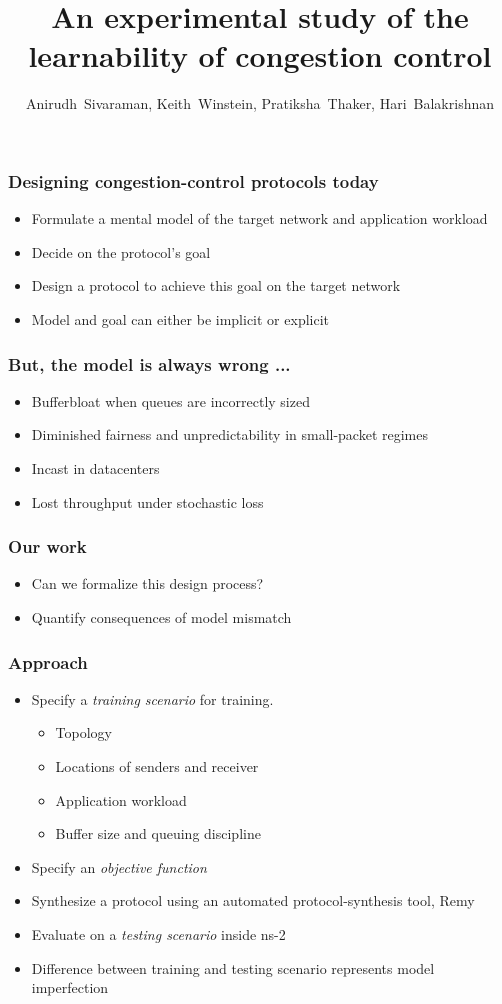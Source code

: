 \documentclass[svgnames]{beamer}
\title{An experimental study of the learnability of congestion control}
\author{Anirudh~Sivaraman, Keith~Winstein, Pratiksha~Thaker, Hari~Balakrishnan}
\institute{MIT CSAIL\vspace{\baselineskip}}
\begin{document}
\begin{frame}[plain]

\titlepage

\end{frame}

\begin{Large}
\begin{frame}[plain]
\frametitle{Designing congestion-control protocols today}
\begin{itemize}
\item Formulate a mental model of the target network and application workload
\item Decide on the protocol's goal
\item Design a protocol to achieve this goal on the target network
\item Model and goal can either be implicit or explicit
\end{itemize}
\end{frame}

\begin{frame}[plain]
\frametitle{But, the model is always wrong ...}
\begin{itemize}
\item Bufferbloat when queues are incorrectly sized
\item Diminished fairness and unpredictability in small-packet regimes
\item Incast in datacenters
\item Lost throughput under stochastic loss 
\end{itemize}
\end{frame}

\begin{frame}[plain]
\frametitle{Our work}
\begin{itemize}
\item Can we formalize this design process?
\item Quantify consequences of model mismatch
\end{itemize}
\end{frame}

\begin{frame}[plain]
\frametitle{Approach}
\begin{itemize}
\item Specify a \textit{training scenario} for training.
\begin{itemize}
\item Topology
\item Locations of senders and receiver
\item Application workload
\item Buffer size and queuing discipline 
\end{itemize}
\item Specify an \textit{objective function}
\item Synthesize a protocol using an automated protocol-synthesis tool, Remy~\cite{remy}
\item Evaluate on a \textit{testing scenario} inside ns-2
\item Difference between training and testing scenario represents model imperfection
\end{itemize}
\end{frame}


\end{Large}
\end{document}
